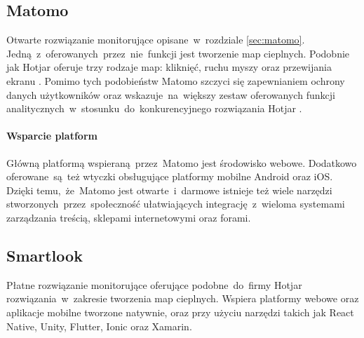 \subsection{Matomo}
Otwarte rozwiązanie monitorujące opisane~w~rozdziale \ref{sec:matomo}. Jedną~z~oferowanych~przez~nie~funkcji jest tworzenie map cieplnych. Podobnie jak Hotjar oferuje trzy rodzaje map: kliknięć, ruchu myszy oraz przewijania ekranu \cite{Matomo_heatmaps}. Pomimo tych podobieństw Matomo szczyci się zapewnianiem ochrony danych użytkowników oraz wskazuje~na~większy zestaw oferowanych funkcji analitycznych~w~stosunku~do~konkurencyjnego rozwiązania Hotjar \cite{Matomo_hotjar}.

\paragraph{Wsparcie platform} 
Główną platformą wspieraną~przez~Matomo jest środowisko webowe. Dodatkowo oferowane~są~też wtyczki obsługujące platformy mobilne Android oraz iOS. Dzięki temu,~że~Matomo jest otwarte~i~darmowe istnieje też wiele narzędzi stworzonych~przez~społeczność ułatwiających integrację~z~wieloma systemami zarządzania treścią, sklepami internetowymi oraz forami.

\subsection{Smartlook}
Płatne rozwiązanie monitorujące oferujące podobne~do~firmy Hotjar rozwiązania~w~zakresie tworzenia map cieplnych. Wspiera platformy webowe oraz aplikacje mobilne tworzone natywnie, oraz przy użyciu narzędzi takich jak React Native, Unity, Flutter, Ionic oraz Xamarin.
